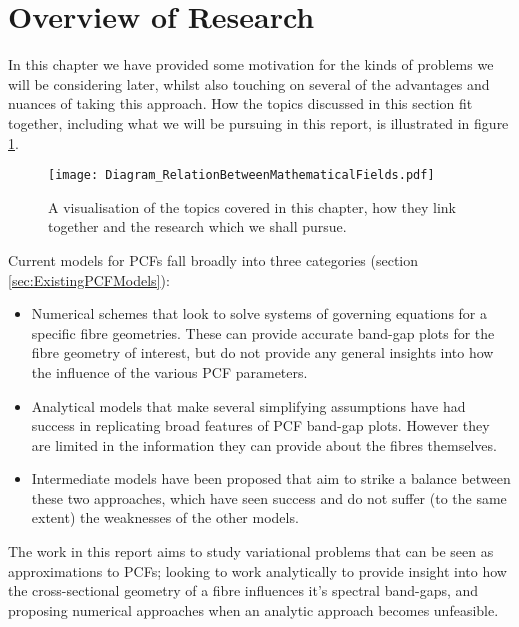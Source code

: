 \section{Overview of Research} \label{sec:ReportOverview}
In this chapter we have provided some motivation for the kinds of problems we will be considering later, whilst also touching on several of the advantages and nuances of taking this approach.
How the topics discussed in this section fit together, including what we will be pursuing in this report, is illustrated in figure \ref{fig:Diagram_RelationBetweenMathematicalFields}.
\begin{figure}[b!]
	\centering
	\texttt{[image: Diagram\_RelationBetweenMathematicalFields.pdf]}
	\caption{\label{fig:Diagram_RelationBetweenMathematicalFields} A visualisation of the topics covered in this chapter, how they link together and the research which we shall pursue.}
\end{figure}
Current models for PCFs fall broadly into three categories (section \ref{sec:ExistingPCFModels}):
\begin{itemize}
	\item Numerical schemes that look to solve systems of governing equations for a specific fibre geometries.
	These can provide accurate band-gap plots for the fibre geometry of interest, but do not provide any general insights into how the influence of the various PCF parameters.
	\item Analytical models that make several simplifying assumptions have had success in replicating broad features of PCF band-gap plots.
	However they are limited in the information they can provide about the fibres themselves.
	\item Intermediate models have been proposed that aim to strike a balance between these two approaches, which have seen success and do not suffer (to the same extent) the weaknesses of the other models.
\end{itemize}
The work in this report aims to study variational problems that can be seen as approximations to PCFs; looking to work analytically to provide insight into how the cross-sectional geometry of a fibre influences it's spectral band-gaps, and proposing numerical approaches when an analytic approach becomes unfeasible. \newline

